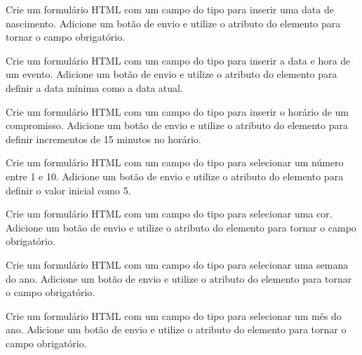 \begin{exercise}
Crie um formulário HTML com um campo do tipo  para inserir uma data de nascimento. Adicione um botão de envio e utilize o atributo  do elemento  para tornar o campo obrigatório.
\end{exercise}

\begin{exercise}
Crie um formulário HTML com um campo do tipo  para inserir a data e hora de um evento. Adicione um botão de envio e utilize o atributo  do elemento  para definir a data mínima como a data atual.
\end{exercise}

\begin{exercise}
Crie um formulário HTML com um campo do tipo  para inserir o horário de um compromisso. Adicione um botão de envio e utilize o atributo  do elemento  para definir incrementos de 15 minutos no horário.
\end{exercise}

\begin{exercise}
Crie um formulário HTML com um campo do tipo  para selecionar um número entre 1 e 10. Adicione um botão de envio e utilize o atributo  do elemento  para definir o valor inicial como 5.
\end{exercise}

\begin{exercise}
Crie um formulário HTML com um campo do tipo  para selecionar uma cor. Adicione um botão de envio e utilize o atributo  do elemento  para tornar o campo obrigatório.
\end{exercise}

\begin{exercise}
Crie um formulário HTML com um campo do tipo  para selecionar uma semana do ano. Adicione um botão de envio e utilize o atributo  do elemento  para tornar o campo obrigatório.
\end{exercise}

\begin{exercise}
Crie um formulário HTML com um campo do tipo  para selecionar um mês do ano. Adicione um botão de envio e utilize o atributo  do elemento  para tornar o campo obrigatório.
\end{exercise}

